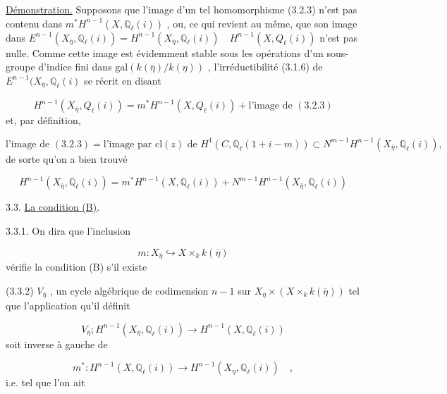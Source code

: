 \underline{Démonstration.} Supposons que l'image d'un tel homomorphisme (3.2.3) n'est pas contenu dans $m^{*}H^{n-1}(X,\mathbb{Q}_{\ell}(i))$ , ou, ce qui revient au même, que son image dans $E^{n-1}(X_{\bar{\eta}},\mathbb{Q}_{\ell}(i)) = H^{n-1}(X_{\bar{\eta}},\mathbb{Q}_{\ell}(i)) \quad H^{n-1}(X,Q_{\ell}(i))$ n'est pas nulle. Comme cette image est évidemment stable sous les opérations d'un sous-groupe d'indice fini dans $\mathrm{gal}(k(\bar{\eta})/k(\eta))$ , l'irréductibilité (3.1.6) de $E^{n-1}(X_{\bar{\eta}},\mathbb{Q}_{\ell}(i)$ se récrit en disant

\begin{equation*}
H^{n-1}(X_{\bar{\eta}},Q_{\ell}(i)) = m^{*}H^{n-1}(X,Q_{\ell}(i)) + \text{l'image de } (3.2.3)
\end{equation*}
et, par définition,

\begin{equation*}
\text{l'image de } (3.2.3) = \text{l'image par } \mathrm{cl}(z) \text{ de } H^{1}(C,\mathbb{Q}_{\ell}(1+i-m)) \subset N^{m-1}H^{n-1}(X_{\bar{\eta}},\mathbb{Q}_{\ell}(i)) ,
\end{equation*}
de sorte qu'on a bien trouvé

\begin{equation*}
H^{n-1}(X_{\bar{\eta}},\mathbb{Q}_{\ell}(i)) = m^{*}H^{n-1}(X,\mathbb{Q}_{\ell}(i)) + N^{m-1}H^{n-1}(X_{\bar{\eta}},\mathbb{Q}_{\ell}(i))
\end{equation*}



3.3. \underline{La condition (B)}.

3.3.1. On dira que l'inclusion

\begin{equation*}
m : X_{\overline{\eta}} \hookrightarrow X \times_{k} k(\overline{\eta})
\end{equation*}
vérifie la condition (B)  s'il existe

(3.3.2) $V_{\overline{\eta}}$ , un cycle algébrique de codimension $n-1$ sur $X_{\overline{\eta}} \times (X \times_{k} k(\overline{\eta}))$ tel que l'application qu'il définit

\begin{equation}\tag{3.3.3}
V_{\overline{\eta}} ; H^{n-1}(X_{\overline{\eta}},\mathbb{Q}_{\ell}(i)) \longrightarrow H^{n-1}(X,\mathbb{Q}_{\ell}(i))
\end{equation}
soit inverse à gauche de

\begin{equation}\tag{3.3.4}
m^* : H^{n-1}(X,\mathbb{Q}_{\ell}(i)) \longrightarrow H^{n-1}(X_{\eta},\mathbb{Q}_{\ell}(i)) \quad ,
\end{equation}
i.e. tel que l'on ait

